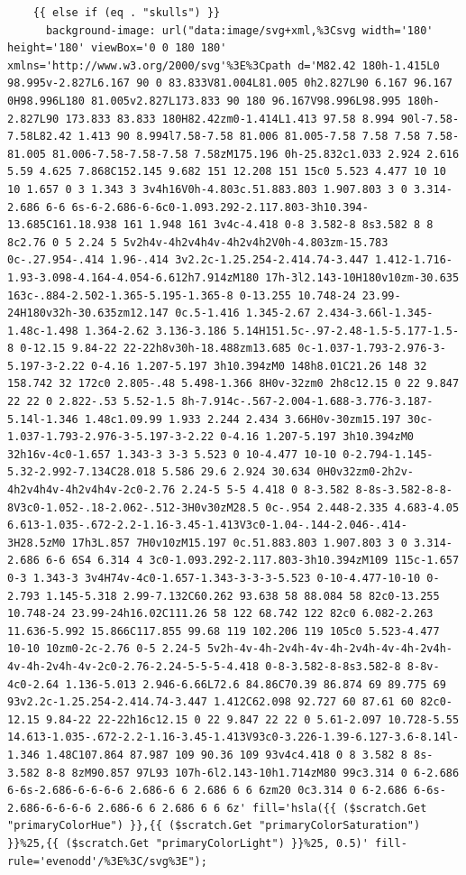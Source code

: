 \documentclass[11pt]{article}
\begin{document}
\begin{enumerate}
\begin{verbatim}
    {{ else if (eq . "skulls") }}
      background-image: url("data:image/svg+xml,%3Csvg width='180' height='180' viewBox='0 0 180 180' xmlns='http://www.w3.org/2000/svg'%3E%3Cpath d='M82.42 180h-1.415L0 98.995v-2.827L6.167 90 0 83.833V81.004L81.005 0h2.827L90 6.167 96.167 0H98.996L180 81.005v2.827L173.833 90 180 96.167V98.996L98.995 180h-2.827L90 173.833 83.833 180H82.42zm0-1.414L1.413 97.58 8.994 90l-7.58-7.58L82.42 1.413 90 8.994l7.58-7.58 81.006 81.005-7.58 7.58 7.58 7.58-81.005 81.006-7.58-7.58-7.58 7.58zM175.196 0h-25.832c1.033 2.924 2.616 5.59 4.625 7.868C152.145 9.682 151 12.208 151 15c0 5.523 4.477 10 10 10 1.657 0 3 1.343 3 3v4h16V0h-4.803c.51.883.803 1.907.803 3 0 3.314-2.686 6-6 6s-6-2.686-6-6c0-1.093.292-2.117.803-3h10.394-13.685C161.18.938 161 1.948 161 3v4c-4.418 0-8 3.582-8 8s3.582 8 8 8c2.76 0 5 2.24 5 5v2h4v-4h2v4h4v-4h2v4h2V0h-4.803zm-15.783 0c-.27.954-.414 1.96-.414 3v2.2c-1.25.254-2.414.74-3.447 1.412-1.716-1.93-3.098-4.164-4.054-6.612h7.914zM180 17h-3l2.143-10H180v10zm-30.635 163c-.884-2.502-1.365-5.195-1.365-8 0-13.255 10.748-24 23.99-24H180v32h-30.635zm12.147 0c.5-1.416 1.345-2.67 2.434-3.66l-1.345-1.48c-1.498 1.364-2.62 3.136-3.186 5.14H151.5c-.97-2.48-1.5-5.177-1.5-8 0-12.15 9.84-22 22-22h8v30h-18.488zm13.685 0c-1.037-1.793-2.976-3-5.197-3-2.22 0-4.16 1.207-5.197 3h10.394zM0 148h8.01C21.26 148 32 158.742 32 172c0 2.805-.48 5.498-1.366 8H0v-32zm0 2h8c12.15 0 22 9.847 22 22 0 2.822-.53 5.52-1.5 8h-7.914c-.567-2.004-1.688-3.776-3.187-5.14l-1.346 1.48c1.09.99 1.933 2.244 2.434 3.66H0v-30zm15.197 30c-1.037-1.793-2.976-3-5.197-3-2.22 0-4.16 1.207-5.197 3h10.394zM0 32h16v-4c0-1.657 1.343-3 3-3 5.523 0 10-4.477 10-10 0-2.794-1.145-5.32-2.992-7.134C28.018 5.586 29.6 2.924 30.634 0H0v32zm0-2h2v-4h2v4h4v-4h2v4h4v-2c0-2.76 2.24-5 5-5 4.418 0 8-3.582 8-8s-3.582-8-8-8V3c0-1.052-.18-2.062-.512-3H0v30zM28.5 0c-.954 2.448-2.335 4.683-4.05 6.613-1.035-.672-2.2-1.16-3.45-1.413V3c0-1.04-.144-2.046-.414-3H28.5zM0 17h3L.857 7H0v10zM15.197 0c.51.883.803 1.907.803 3 0 3.314-2.686 6-6 6S4 6.314 4 3c0-1.093.292-2.117.803-3h10.394zM109 115c-1.657 0-3 1.343-3 3v4H74v-4c0-1.657-1.343-3-3-3-5.523 0-10-4.477-10-10 0-2.793 1.145-5.318 2.99-7.132C60.262 93.638 58 88.084 58 82c0-13.255 10.748-24 23.99-24h16.02C111.26 58 122 68.742 122 82c0 6.082-2.263 11.636-5.992 15.866C117.855 99.68 119 102.206 119 105c0 5.523-4.477 10-10 10zm0-2c-2.76 0-5 2.24-5 5v2h-4v-4h-2v4h-4v-4h-2v4h-4v-4h-2v4h-4v-4h-2v4h-4v-2c0-2.76-2.24-5-5-5-4.418 0-8-3.582-8-8s3.582-8 8-8v-4c0-2.64 1.136-5.013 2.946-6.66L72.6 84.86C70.39 86.874 69 89.775 69 93v2.2c-1.25.254-2.414.74-3.447 1.412C62.098 92.727 60 87.61 60 82c0-12.15 9.84-22 22-22h16c12.15 0 22 9.847 22 22 0 5.61-2.097 10.728-5.55 14.613-1.035-.672-2.2-1.16-3.45-1.413V93c0-3.226-1.39-6.127-3.6-8.14l-1.346 1.48C107.864 87.987 109 90.36 109 93v4c4.418 0 8 3.582 8 8s-3.582 8-8 8zM90.857 97L93 107h-6l2.143-10h1.714zM80 99c3.314 0 6-2.686 6-6s-2.686-6-6-6-6 2.686-6 6 2.686 6 6 6zm20 0c3.314 0 6-2.686 6-6s-2.686-6-6-6-6 2.686-6 6 2.686 6 6 6z' fill='hsla({{ ($scratch.Get "primaryColorHue") }},{{ ($scratch.Get "primaryColorSaturation") }}%25,{{ ($scratch.Get "primaryColorLight") }}%25, 0.5)' fill-rule='evenodd'/%3E%3C/svg%3E");

\end{verbatim}
\end{enumerate}
\end{document}
